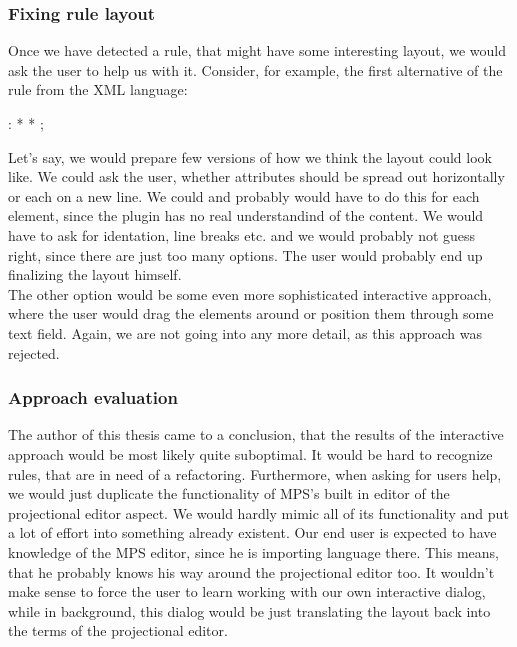 \subsubsection{Fixing rule layout}

Once we have detected a rule, that might have some interesting layout, we would ask the user to help us with it.
Consider, for example, the first alternative of the  rule from the XML language:

\begin{antlr}
	  :   \literal{<}  * \literal{>} * \literal{</}  \literal{>} ;
\end{antlr}

Let's say, we would prepare few versions of how we think the layout could look like.
We could ask the user, whether attributes should be spread out horizontally or each on a new line.
We could and probably would have to do this for each element, since the plugin has no real understandind of the content.
We would have to ask for identation, line breaks etc. and we would probably not guess right, since there are just too many options.
The user would probably end up finalizing the layout himself.
\\

The other option would be some even more sophisticated interactive approach, where the user would drag the elements around or position them through some text field.
Again, we are not going into any more detail, as this approach was rejected.

\subsubsection{Approach evaluation}
\label{chap:interactive_approach_evaluation}

The author of this thesis came to a conclusion, that the results of the interactive approach would be most likely quite suboptimal.
It would be hard to recognize rules, that are in need of a refactoring.
Furthermore, when asking for users help, we would just duplicate the functionality of MPS's built in editor of the projectional editor aspect.
We would hardly mimic all of its functionality and put a lot of effort into something already existent.
Our end user is expected to have knowledge of the MPS editor, since he is importing language there.
This means, that he probably knows his way around the projectional editor too.
It wouldn't make sense to force the user to learn working with our own interactive dialog, while in background, this dialog would be just translating the layout back into the terms of the projectional editor.

